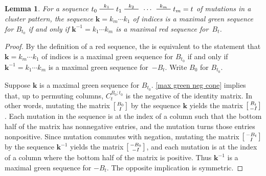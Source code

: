 \documentclass{amsart}
\newtheorem{lemma}[proposition]{Lemma}
\theoremstyle{definition}
\theoremstyle{remark}
\numberwithin{equation}{section}
\newcommand{\edge}{\,\,\rule[2.7pt]{20pt}{0.5pt}\,\,}
\newcommand{\I}{{\mathcal I}}
\newcommand{\0}{{\mathbf{0}}}
\newcommand{\kk}{{\boldsymbol{k}}}
\begin{document}
\begin{lemma}\label{max red green}
For a sequence $t_0\overset{k_1}{\edge}t_1\overset{k_2}{\edge}\,\cdots\,\overset{k_m}{\edge}t_m=t$ of mutations in a cluster pattern, the sequence $\kk=k_m\cdots k_1$ of indices is a maximal green sequence for $B_{t_0}$ if and only if $\kk^{-1}=k_1\cdots k_m$ is a maximal red sequence for~$B_t$.
\end{lemma}
\begin{proof}
By the definition of a red sequence, the  is equivalent to the statement that  $\kk=k_m\cdots k_1$ of indices is a maximal green sequence for $B_{t_0}$ if and only if $\kk^{-1}=k_1\cdots k_m$ is a maximal green sequence for~$-B_t$.
Write $B_0$ for $B_{t_0}$.

Suppose $\kk$ is a maximal green sequence for $B_{t_0}$.
\cref{max green neg cone} implies that, up to permuting columns, $C_t^{B_0;t_0}$ is the negative of the identity matrix.
In other words, mutating the matrix $\begin{bsmallmatrix}B_0\\I\end{bsmallmatrix}$ by the sequence $\kk$ yields the matrix $\begin{bsmallmatrix}B_t\\-I\end{bsmallmatrix}$.
Each mutation in the sequence is at the index of a column such that the bottom half of the matrix has nonnegative entries, and the mutation turns those entries nonpositive.
Since mutation commutes with negation, mutating the matrix $\begin{bsmallmatrix}-B_t\\I\end{bsmallmatrix}$ by the sequence $\kk^{-1}$ yields the matrix $\begin{bsmallmatrix}-B_0\\-I\end{bsmallmatrix}$, and each mutation is at the index of a column where the bottom half of the matrix is positive.
Thus $\kk^{-1}$ is a maximal green sequence for $-B_t$.
The opposite implication is symmetric.
\end{proof}
\end{document}
